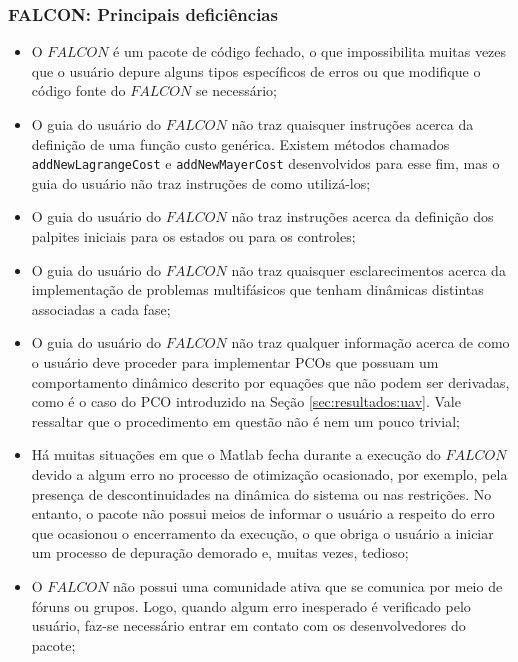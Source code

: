 \subsubsection{FALCON: Principais deficiências}
\begin{itemize}
	\item O $FALCON$ é um pacote de código fechado, o que impossibilita muitas vezes que o usuário depure alguns tipos específicos de erros ou que modifique o código fonte do $FALCON$ se necessário;
	
	\item O guia do usuário do $FALCON$ não traz quaisquer instruções acerca da definição de uma função custo genérica. Existem métodos chamados \texttt{addNewLagrangeCost} e \texttt{addNewMayerCost} desenvolvidos para esse fim, mas o guia do usuário não traz instruções de como utilizá-los;
	
	\item O guia do usuário do $FALCON$ não traz instruções acerca da definição dos palpites iniciais para os estados ou para os controles;
	
	\item O guia do usuário do $FALCON$ não traz quaisquer esclarecimentos acerca da implementação de problemas multifásicos que tenham dinâmicas distintas associadas a cada fase;
	
	\item O guia do usuário do $FALCON$ não traz qualquer informação acerca de como o usuário deve proceder para implementar PCOs que possuam um comportamento dinâmico descrito por equações que não podem ser derivadas, como é o caso do PCO introduzido na Seção \ref{sec:resultados:uav}. Vale ressaltar que o procedimento em questão não é nem um pouco trivial;
	
	\item Há muitas situações em que o Matlab\textsuperscript{\textregistered} fecha durante a execução do $FALCON$ devido a algum erro no processo de otimização ocasionado, por exemplo, pela presença de descontinuidades na dinâmica do sistema ou nas restrições. No entanto, o pacote não possui meios de informar o usuário a respeito do erro que ocasionou o encerramento da execução, o que obriga o usuário a iniciar um processo de depuração demorado e, muitas vezes, tedioso;
	
	\item O $FALCON$ não possui uma comunidade ativa que se comunica por meio de fóruns ou grupos. Logo, quando algum erro inesperado é verificado pelo usuário, faz-se necessário  entrar em contato com os desenvolvedores do pacote;
	

\end{itemize}
